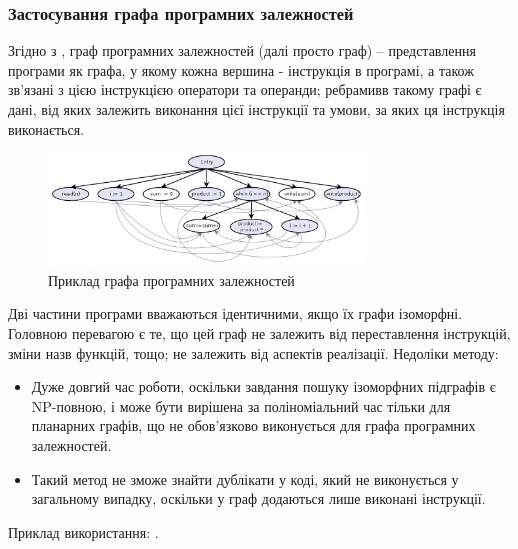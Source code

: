 \documentclass[a4paper, 14pt]{article}
\begin{document}
\subsubsection{Застосування графа програмних залежностей}
Згідно з \cite{Ferrante87}, граф програмних залежностей (далі просто граф) -- представлення програми як графа, у якому кожна вершина - інструкція в програмі, а також зв'язані з цією інструкцією оператори та операнди; ребрамивв такому графі є дані, від яких залежить виконання цієї інструкції та умови, за яких ця інструкція виконається.
\begin{figure}[h]
    \centering
    \includegraphics[width=0.75\textwidth]{pdg-example}
    \caption{Приклад графа програмних залежностей \cite{pdg-example}}
    \label{fig:pdg-example}
\end{figure} 
Дві частини програми вважаються ідентичними, якщо їх графи ізоморфні.
Головною перевагою є те, що цей граф не залежить від переставлення інструкцій, зміни назв функцій, тощо; не залежить від аспектів реалізації.
Недоліки методу:
\begin{itemize}
\item Дуже довгий час роботи, оскільки завдання пошуку ізоморфних підграфів є NP-повною, і може бути вирішена за поліноміальний час тільки для планарних графів, що не обов'язково виконується для графа програмних залежностей.
\item Такий метод не зможе знайти дублікати у коді, який не виконується у загальному випадку, оскільки у граф додаються лише виконані інструкції.
\end{itemize}
Приклад використання: \cite{Liu06}.
\end{document}
